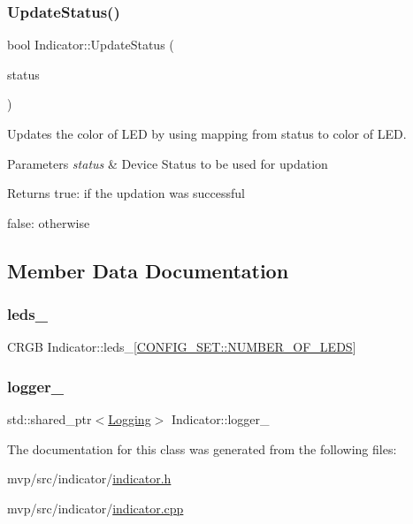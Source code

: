 \subsubsection{\texorpdfstring{Update\+Status()}{UpdateStatus()}}
{\footnotesize\ttfamily bool Indicator\+::\+Update\+Status (\begin{DoxyParamCaption}\item[{\hyperlink{namespaceCONFIG__SET_a8379cbe9f81ee38829b156f47261081a}{C\+O\+N\+F\+I\+G\+\_\+\+S\+E\+T\+::\+D\+E\+V\+I\+C\+E\+\_\+\+S\+T\+A\+T\+US}}]{status }\end{DoxyParamCaption})}



Updates the color of L\+ED by using mapping from status to color of L\+ED. 


\begin{DoxyParams}{Parameters}
{\em status} & Device Status to be used for updation \\
\hline
\end{DoxyParams}
\begin{DoxyReturn}{Returns}
true\+: if the updation was successful 

false\+: otherwise 
\end{DoxyReturn}


\subsection{Member Data Documentation}
\mbox{\label{classIndicator_a1b4352e0b1bbed1fa14daf4424120d27}} 
\subsubsection{\texorpdfstring{leds\+\_\+}{leds\_}}
{\footnotesize\ttfamily C\+R\+GB Indicator\+::leds\+\_\+\mbox{[}\hyperlink{namespaceCONFIG__SET_a91d987372150d727ecbb41b39d482911}{C\+O\+N\+F\+I\+G\+\_\+\+S\+E\+T\+::\+N\+U\+M\+B\+E\+R\+\_\+\+O\+F\+\_\+\+L\+E\+DS}\mbox{]}\hspace{0.3cm}{\ttfamily [private]}}

\mbox{\label{classIndicator_a52fa4ed25549f6ae99fba1743a15d628}} 
\subsubsection{\texorpdfstring{logger\+\_\+}{logger\_}}
{\footnotesize\ttfamily std\+::shared\+\_\+ptr$<$\hyperlink{classLogging}{Logging}$>$ Indicator\+::logger\+\_\+\hspace{0.3cm}{\ttfamily [private]}}



The documentation for this class was generated from the following files\+:\begin{DoxyCompactItemize}
\item 
mvp/src/indicator/\hyperlink{indicator_8h}{indicator.\+h}\item 
mvp/src/indicator/\hyperlink{indicator_8cpp}{indicator.\+cpp}\end{DoxyCompactItemize}
